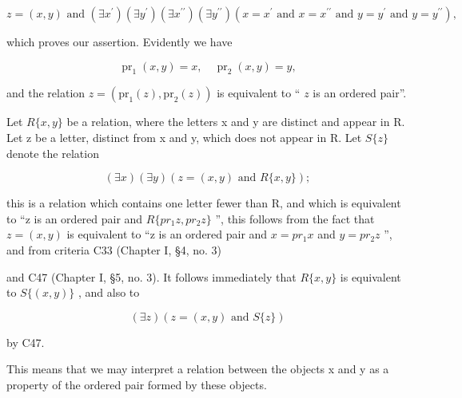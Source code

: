 \[
z = (x, y) \text { and } (\exists x ^ {\prime}) (\exists y ^ {\prime}) (\exists x ^ {\prime \prime}) (\exists y ^ {\prime \prime}) (x = x ^ {\prime} \text { and } x = x ^ {\prime \prime} \text { and } y = y ^ {\prime} \text { and } y = y ^ {\prime \prime}),
\]

which proves our assertion. Evidently we have

\[
\operatorname{pr} _ {1} (x, y) = x, \quad \operatorname{pr} _ {2} (x, y) = y,
\]

and the relation \(z = (\mathrm{pr}_1(z), \mathrm{pr}_2(z))\) is equivalent to `` \(z\) is an ordered pair''.

Let \(R\{x, y\}\) be a relation, where the letters x and y are distinct and appear in R. Let z be a letter, distinct from x and y, which does not appear in R. Let \(S\{z\}\) denote the relation

\[
(\exists x) (\exists y) (z = (x, y) \text {   and   } R \{x, y \});
\]

this is a relation which contains one letter fewer than R, and which is equivalent to ``z is an ordered pair and \(R\{pr_{1}z, pr_{2}z\}\) '', this follows from the fact that \(z = (x, y)\) is equivalent to ``z is an ordered pair and \(x = pr_{1}x\) and \(y = pr_{2}z\) '', and from criteria C33 (Chapter I, §4, no. 3)

and C47 (Chapter I, §5, no. 3). It follows immediately that \(R\{x, y\}\) is equivalent to \(S\{(x, y)\}\) , and also to

\[
(\exists z) (z = (x, y) \text {   and   } S \{z \})
\]

by C47.

This means that we may interpret a relation between the objects x and y as a property of the ordered pair formed by these objects.

